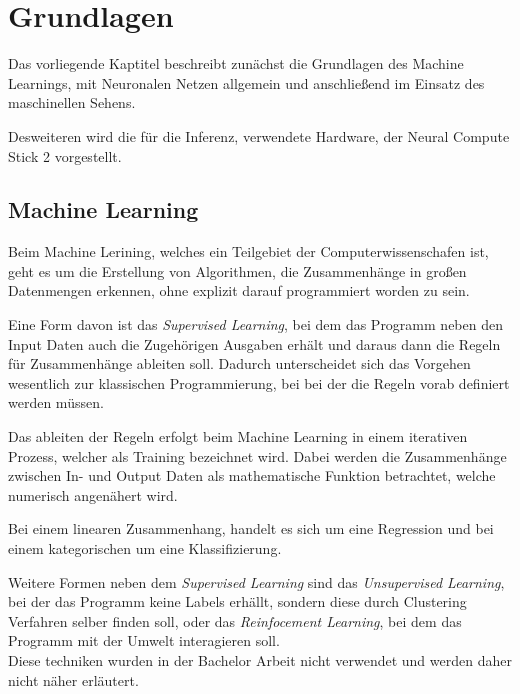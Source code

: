 \chapter{Grundlagen}\label{kap:grundlagen}


Das vorliegende Kaptitel beschreibt zunächst die Grundlagen des Machine 
Learnings, mit Neuronalen Netzen allgemein und anschließend im 
Einsatz des maschinellen Sehens.

Desweiteren wird die für die Inferenz, verwendete Hardware, 
der Neural Compute Stick 2 vorgestellt.



\section{Machine Learning}\label{sec:ml}

Beim Machine Lerining, welches ein Teilgebiet der Computerwissenschafen
ist, geht es um die Erstellung von Algorithmen, die Zusammenhänge in großen
Datenmengen erkennen, ohne explizit darauf programmiert worden zu sein.

Eine Form davon ist das \textit{Supervised Learning}, bei dem das Programm 
neben den Input Daten auch die Zugehörigen Ausgaben erhält und daraus 
dann die Regeln für Zusammenhänge ableiten soll.
Dadurch unterscheidet sich das Vorgehen wesentlich zur klassischen Programmierung,
bei bei der die Regeln vorab definiert werden müssen.


%     



Das ableiten der Regeln erfolgt beim Machine Learning in einem 
iterativen Prozess, welcher als Training bezeichnet wird.
Dabei werden die Zusammenhänge zwischen In- und Output Daten 
als mathematische Funktion betrachtet, welche numerisch 
angenähert wird.

Bei einem linearen Zusammenhang, handelt es sich
um eine Regression und bei einem kategorischen um 
eine Klassifizierung.


Weitere Formen neben dem \textit{Supervised Learning} sind das 
\textit{Unsupervised Learning}, bei der das Programm keine Labels 
erhällt, sondern diese durch Clustering Verfahren selber finden 
soll, oder das \textit{Reinfocement Learning}, bei dem das Programm 
mit der Umwelt interagieren soll.
\\
Diese techniken wurden in der Bachelor Arbeit nicht verwendet 
und werden daher nicht näher erläutert.

